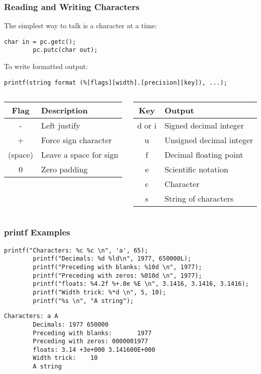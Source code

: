 \begin{frame}[fragile]
	\frametitle{Reading and Writing Characters}
	The simplest way to talk is a character at a time:
	\begin{lstlisting}[numbers=none,multicols=2]
		char in = pc.getc();
		pc.putc(char out);
	\end{lstlisting}
	To write formatted output:
	\begin{lstlisting}[numbers=none]
		printf(string format (%[flags][width].[precision][key]), ...);
	\end{lstlisting}
	\begin{columns}[T]
		\begin{column}{0.5\textwidth}
			\begin{tabular}{c|l}
				Flag & Description\\
				\hline
				- & Left justify\\
				+ & Force sign character\\
				(space) & Leave a space for sign\\
				0 & Zero padding\\
			\end{tabular}
		\end{column}
		\begin{column}{0.5\textwidth}
			\begin{tabular}{c|l}
				Key & Output\\
				\hline
				d or i & Signed decimal integer\\
				u & Unsigned decimal integer\\
				f & Decimal floating point\\
				e & Scientific notation\\
				c & Character\\
				s & String of characters\\
			\end{tabular}
		\end{column}
	\end{columns}
\end{frame}

\begin{frame}[fragile]
	\frametitle{printf Examples}
	\begin{lstlisting}[caption={Code}]
		printf("Characters: %c %c \n", 'a', 65);
		printf("Decimals: %d %ld\n", 1977, 650000L);
		printf("Preceding with blanks: %10d \n", 1977);
		printf("Preceding with zeros: %010d \n", 1977);
		printf("floats: %4.2f %+.0e %E \n", 3.1416, 3.1416, 3.1416);
		printf("Width trick: %*d \n", 5, 10);
		printf("%s \n", "A string");
	\end{lstlisting}
	\begin{lstlisting}[caption={Output}]
		Characters: a A
		Decimals: 1977 650000
		Preceding with blanks:       1977
		Preceding with zeros: 0000001977
		floats: 3.14 +3e+000 3.141600E+000
		Width trick:    10
		A string
	\end{lstlisting}
\end{frame}


